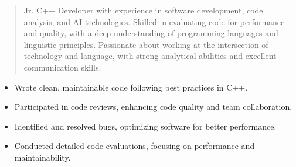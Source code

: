 




\makecvheader

\begin{quote}
  \noindent
  Jr. C++ Developer with experience in software development, code analysis, and AI technologies. Skilled in evaluating code for performance and quality, with a deep understanding of programming languages and linguistic principles. Passionate about working at the intersection of technology and language, with strong analytical abilities and excellent communication skills.
\end{quote}

\par\smallskip
\noindent
\begin{minipage}{20cm}
  \begin{minipage}{9.75cm}
    \begin{itemize}
      \item Wrote clean, maintainable code following best practices in C++.
      \item Participated in code reviews, enhancing code quality and team collaboration.
    \end{itemize}
  \end{minipage}
  \hfill
  \begin{minipage}{9.75cm}
    \begin{itemize}
      \item Identified and resolved bugs, optimizing software for better performance.
      \item Conducted detailed code evaluations, focusing on performance and maintainability.
    \end{itemize}
  \end{minipage}
\end{minipage}
\par\smallskip
\divider

